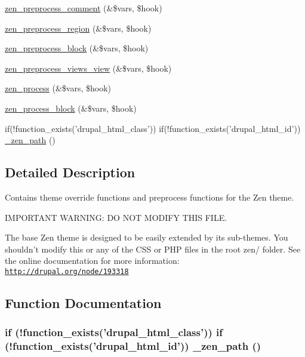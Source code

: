 \begin{CompactItemize}
\item 
\hyperlink{sites_2all_2themes_2zen_2template_8php_e3144098bb1a4d10b5c4b2deaf08afe7}{zen\_\-preprocess\_\-comment} (\&\$vars, \$hook)
\item 
\hyperlink{sites_2all_2themes_2zen_2template_8php_1fa9b7695fa6d89f176bb01c32ad837f}{zen\_\-preprocess\_\-region} (\&\$vars, \$hook)
\item 
\hyperlink{sites_2all_2themes_2zen_2template_8php_1004cb430e9ecab4c4dc373a30e2340e}{zen\_\-preprocess\_\-block} (\&\$vars, \$hook)
\item 
\hyperlink{sites_2all_2themes_2zen_2template_8php_0b913a3a96d6f2f6e457cbf08197e9cc}{zen\_\-preprocess\_\-views\_\-view} (\&\$vars, \$hook)
\item 
\hyperlink{sites_2all_2themes_2zen_2template_8php_3790b825810aa4bfd00c27c37817a7d8}{zen\_\-process} (\&\$vars, \$hook)
\item 
\hyperlink{sites_2all_2themes_2zen_2template_8php_0c023dd21d8efaa99574aa6821bfcc32}{zen\_\-process\_\-block} (\&\$vars, \$hook)
\item 
if(!function\_\-exists('drupal\_\-html\_\-class')) if(!function\_\-exists('drupal\_\-html\_\-id')) \hyperlink{sites_2all_2themes_2zen_2template_8php_18a0c8640a660d394193e10081bdaa31}{\_\-zen\_\-path} ()
\end{CompactItemize}


\subsection{Detailed Description}
Contains theme override functions and preprocess functions for the Zen theme.

IMPORTANT WARNING: DO NOT MODIFY THIS FILE.

The base Zen theme is designed to be easily extended by its sub-themes. You shouldn't modify this or any of the CSS or PHP files in the root zen/ folder. See the online documentation for more information: \href{http://drupal.org/node/193318}{\tt http://drupal.org/node/193318} 

\subsection{Function Documentation}
\hypertarget{sites_2all_2themes_2zen_2template_8php_18a0c8640a660d394193e10081bdaa31}{
\subsubsection[{\_\-zen\_\-path}]{\setlength{\rightskip}{0pt plus 5cm}if (!function\_\-exists('drupal\_\-html\_\-class')) if (!function\_\-exists('drupal\_\-html\_\-id')) \_\-zen\_\-path ()}}
\label{sites_2all_2themes_2zen_2template_8php_18a0c8640a660d394193e10081bdaa31}


